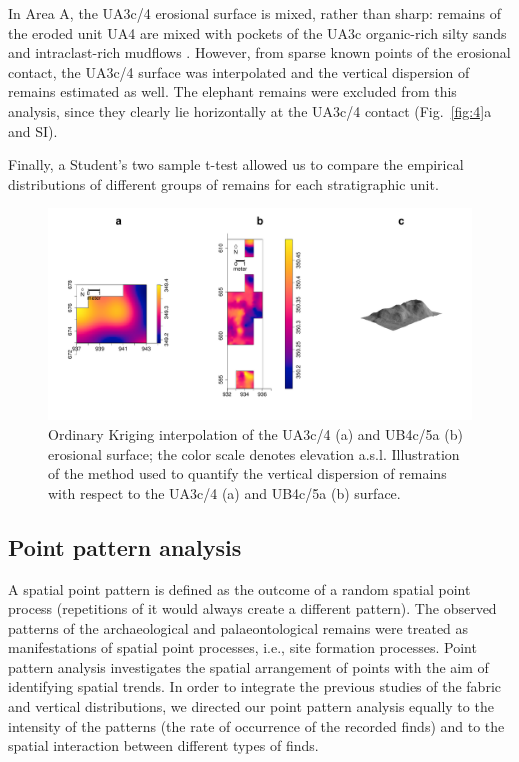 \documentclass[preprint,authoryear,times]{elsarticle} %
\begin{document}
In Area A, the UA3c/4 erosional surface is mixed, rather than sharp: remains of the eroded unit UA4 are mixed with pockets of the UA3c organic-rich silty sands and intraclast-rich mudflows \citep{Karkanas}. However, from sparse known points of the erosional contact, the UA3c/4 surface was interpolated and the vertical dispersion of remains estimated as well. The elephant remains were excluded from this analysis, since they clearly lie horizontally at the UA3c/4 contact (Fig.~\ref{fig:4}a and SI).

Finally, a Student's two sample t-test allowed us to compare the empirical distributions of different groups of remains for each stratigraphic unit.

\begin{figure}[]
  \centering
  \includegraphics[width=1\textwidth]{../artwork/Fig5.pdf}
  \caption{Ordinary Kriging interpolation of the UA3c/4 (a) and UB4c/5a (b) erosional surface; the color scale denotes elevation a.s.l. Illustration of the method used to quantify the vertical dispersion of remains with respect to the UA3c/4 (a) and UB4c/5a (b) surface.}
  \label{fig:5}
\end{figure}

\subsection{Point pattern analysis}

A spatial point pattern is defined as the outcome of a random spatial point process (repetitions of it would always create a different pattern). The observed patterns of the archaeological and palaeontological remains were treated as manifestations of spatial point processes, i.e., site formation processes. Point pattern analysis investigates the spatial arrangement of points with the aim of identifying spatial trends. In order to integrate the previous studies of the fabric and vertical distributions, we directed our point pattern analysis equally to the intensity of the patterns (the rate of occurrence of the recorded finds) and to the spatial interaction between different types of finds.
\end{document}
